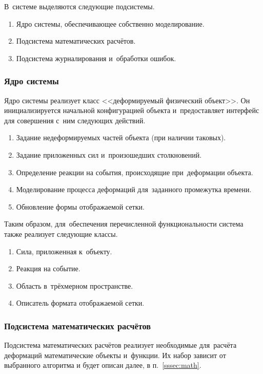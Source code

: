 \documentclass[a4paper, 14pt, titlepage]{extarticle}
\begin{document}
      В~системе выделяются следующие подсистемы.
      \begin{enumerate}
        \item Ядро системы, обеспечивающее собственно моделирование.
        \item Подсистема математических расчётов.
        \item Подсистема журналирования и~обработки ошибок.
      \end{enumerate}

      \subsubsection{Ядро системы}\label{sssec:core}

        Ядро системы реализует класс <<деформируемый физический объект>>. Он инициализируется
        начальной конфигурацией объекта и~предоставляет интерфейс для совершения с~ним следующих действий.
        \begin{enumerate}
          \item Задание недеформируемых частей объекта (при наличии таковых).
          \item Задание приложенных сил и~произошедших столкновений.
          \item Определение реакции на события, происходящие при~деформации объекта.
          \item Моделирование процесса деформаций для~заданного промежутка времени.
          \item Обновление формы отображаемой сетки.
        \end{enumerate}

        Таким образом, для~обеспечения перечисленной функциональности система также реализует следующие классы.
        \begin{enumerate}
          \item Сила, приложенная к~объекту.
          \item Реакция на событие.
          \item Область в~трёхмерном пространстве.
          \item Описатель формата отображаемой сетки.
        \end{enumerate}

      \subsubsection{Подсистема математических расчётов}

        Подсистема математических расчётов реализует необходимые для~расчёта деформаций математические объекты
        и~функции. Их набор зависит от выбранного алгоритма и будет описан далее, в п.~\ref{sssec:math}.
\end{document}

